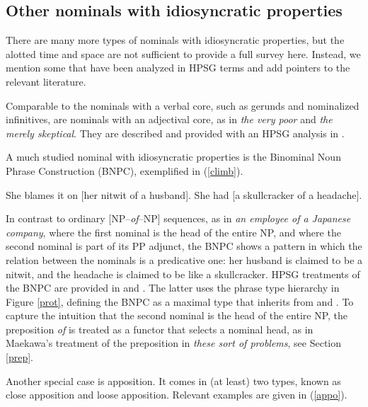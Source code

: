 \documentclass[output=paper
                ,modfonts
                ,nonflat
	        ,collection
	        ,collectionchapter
	        ,collectiontoclongg
 	        ,biblatex
                ,babelshorthands
                ,newtxmath
                ,draftmode
                ,colorlinks, citecolor=brown
]{./langsci/langscibook}
\begin{document}
\subsection{Other nominals with idiosyncratic properties} 
\label{other}


There are many more types of nominals with idiosyncratic properties,
but the alotted time and space are not sufficient to provide a full survey here. 
Instead, we mention some that have been analyzed in HPSG terms and add pointers 
to the relevant literature.    

Comparable to the nominals with a verbal core, such as gerunds and nominalized 
infinitives, are nominals with an adjectival core, as in \emph{the very poor} and 
\emph{the merely skeptical}. They are described and provided with an HPSG analysis 
in \citet{ArnoldSpencer2015}.

A much studied nominal with idiosyncratic properties is the Binominal Noun Phrase 
Construction (BNPC), exemplified in (\ref{climb}). 

\begin{exe}
\ex\label{climb}
\begin{xlist}
\ex  She blames it on [her nitwit of a husband]. 
\ex  She had [a skullcracker of a headache]. 
\end{xlist}
\end{exe}

\noindent
In contrast to ordinary [NP--\emph{of}--NP] sequences, 
as in \emph{an employee of a Japanese company}, where the 
first nominal is the head of the entire NP, and where the second 
nominal is part of its PP adjunct, the BNPC shows a pattern
in which the relation between the nominals is a predicative one: 
her husband is claimed to be a nitwit, and the headache is claimed to be 
like a skullcracker. HPSG treatments of the BNPC are provided in
\citet{KimSells14} and \citet{VanEynde18}. The latter uses 
the phrase type hierarchy in Figure \ref{prot}, defining the BNPC as 
a maximal type that inherits from  and 
. To capture the intuition that the second
nominal is the head of the entire NP, the preposition \emph{of} is 
treated as a functor that selects a nominal head, as in Maekawa's treatment of 
the preposition in \emph{these sort of problems}, see Section \ref{prep}. 

Another special case is apposition. It comes in (at least) two types, known as 
close apposition and loose apposition. Relevant examples are given in (\ref{appo}). 
\end{document}
